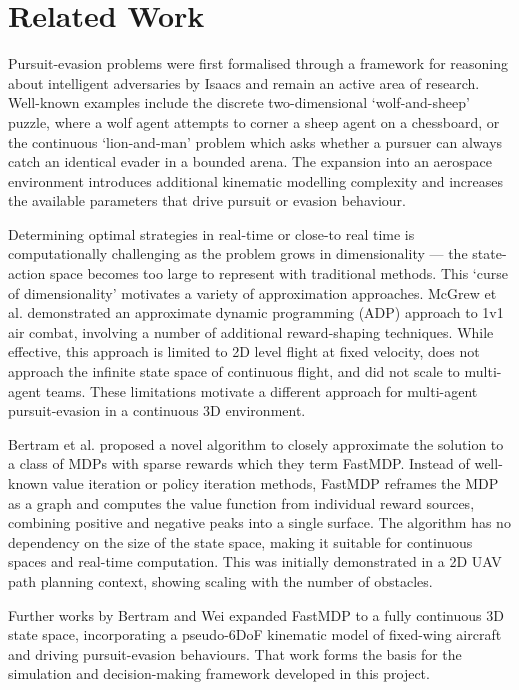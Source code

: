 \label{sec:2}

\section{Related Work}
\label{sec:2.1}
Pursuit-evasion problems were first formalised through a framework for reasoning about intelligent adversaries by Isaacs\cite{isaacs1965} and remain an active area of research. Well-known examples include the discrete two-dimensional `wolf-and-sheep' puzzle, where a wolf agent attempts to corner a sheep agent on a chessboard, or the continuous `lion-and-man' problem which asks whether a pursuer can always catch an identical evader in a bounded arena. The expansion into an aerospace environment introduces additional kinematic modelling complexity and increases the available parameters that drive pursuit or evasion behaviour.

Determining optimal strategies in real-time or close-to real time is computationally challenging as the problem grows in dimensionality --- the state-action space becomes too large to represent with traditional methods\cite{bertsekas1996,powell2007}. This ‘curse of dimensionality’\cite{bellman1957} motivates a variety of approximation approaches. McGrew et al.\cite{mcgrew2010} demonstrated an approximate dynamic programming (ADP) approach to 1v1 air combat, involving a number of additional reward-shaping techniques. While effective, this approach is limited to 2D level flight at fixed velocity, does not approach the infinite state space of continuous flight\cite{bertram3d}, and did not scale to multi-agent teams. These limitations motivate a different approach for multi-agent pursuit-evasion in a continuous 3D environment.

Bertram et al.\cite{bertram2d} proposed a novel algorithm to closely approximate the solution to a class of MDPs with sparse rewards which they term FastMDP. Instead of well-known value iteration or policy iteration methods\cite{bellman1957,sutton1998}, FastMDP reframes the MDP as a graph and computes the value function from individual reward sources, combining positive and negative peaks into a single surface. The algorithm has no dependency on the size of the state space, making it suitable for continuous spaces and real-time computation. This was initially demonstrated in a 2D UAV path planning context, showing scaling with the number of obstacles.

Further works by Bertram and Wei\cite{bertram3d} expanded FastMDP to a fully continuous 3D state space, incorporating a pseudo-6DoF kinematic model of fixed-wing aircraft and driving pursuit-evasion behaviours. That work forms the basis for the simulation and decision-making framework developed in this project.



